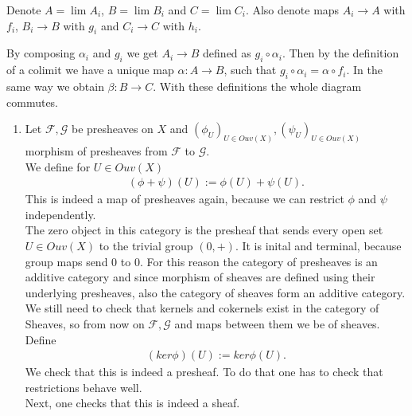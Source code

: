 \begin{exercise}{2}
    Denote $A = \lim A_i$, $B = \lim B_i$ and $C = \lim C_i$. Also denote maps
    $A_i \rightarrow A$ with $f_i$, $B_i \rightarrow B$ with $g_i$ and $C_i
    \rightarrow C$ with $h_i$.

    By composing $\alpha_i$ and $g_i$ we get $A_i \rightarrow B$ defined as $g_i
    \circ \alpha_i$. Then by the definition of a colimit we have a unique map $\alpha:A
    \rightarrow B$, such that $g_i \circ \alpha_i = \alpha
    \circ f_i$. In the same way we obtain $\beta \colon B \rightarrow C$. With
    these definitions the whole diagram commutes.
\end{exercise}

\begin{exercise}{3}
    \begin{enumerate}
        \item Let $\mathcal{F}, \mathcal{G}$ be presheaves on $X$ and $(\phi_U)_{U\in Ouv(X)}, 
        (\psi_U)_{U\in Ouv(X)}$ morphism of presheaves from $\mathcal{F}$ to $\mathcal{G}$.\\
        We define for $U\in Ouv(X)$
        \begin{align*}
            (\phi+\psi)(U):=\phi(U)+\psi(U).
        \end{align*}
        This is indeed a map of presheaves again, because we can
        restrict $\phi$ and $\psi$ independently.\\
        The zero object in this category is the presheaf that sends 
        every open set $U\in Ouv(X)$ to the trivial group $(0,+)$. 
        It is inital and terminal, because group maps send $0$ to $0$.
        For this reason the category of presheaves is an additive category
        and since morphism of sheaves are defined using their underlying
        presheaves, also the category of sheaves form an additive category.\\
        We still need to check that kernels and cokernels exist in the 
        category of Sheaves, so from now on $\mathcal{F},\mathcal{G}$
        and maps between them we be of sheaves.\\
        Define 
        \begin{align*}
            (ker\phi)(U):=ker\phi(U).
        \end{align*}
        We check that this is indeed a presheaf. To do that one has 
        to check that restrictions behave well.\\
        Next, one checks that this is indeed a sheaf.
    \end{enumerate}
\end{exercise}


